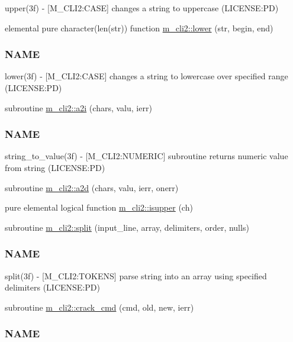 \begin{DoxyCompactItemize}
\begin{DoxyCompactList}
upper(3f) -\/ \mbox{[}M\+\_\+\+C\+L\+I2\+:C\+A\+SE\mbox{]} changes a string to uppercase (L\+I\+C\+E\+N\+SE\+:PD) \end{DoxyCompactList}\item 
elemental pure character(len(str)) function \mbox{\hyperlink{namespacem__cli2_a6d2d93ab8471667e632bf7a0e95ebd13}{m\+\_\+cli2\+::lower}} (str, begin, end)
\begin{DoxyCompactList}\small\item\em \subsubsection*{N\+A\+ME}

lower(3f) -\/ \mbox{[}M\+\_\+\+C\+L\+I2\+:C\+A\+SE\mbox{]} changes a string to lowercase over specified range (L\+I\+C\+E\+N\+SE\+:PD) \end{DoxyCompactList}\item 
subroutine \mbox{\hyperlink{namespacem__cli2_a0be58233adafc0bf10dfe69300a05b9f}{m\+\_\+cli2\+::a2i}} (chars, valu, ierr)
\begin{DoxyCompactList}\small\item\em \subsubsection*{N\+A\+ME}

string\+\_\+to\+\_\+value(3f) -\/ \mbox{[}M\+\_\+\+C\+L\+I2\+:N\+U\+M\+E\+R\+IC\mbox{]} subroutine returns numeric value from string (L\+I\+C\+E\+N\+SE\+:PD) \end{DoxyCompactList}\item 
subroutine \mbox{\hyperlink{namespacem__cli2_ad9e1de0ea9d2b4ed758b2a76bf143bd2}{m\+\_\+cli2\+::a2d}} (chars, valu, ierr, onerr)
\item 
pure elemental logical function \mbox{\hyperlink{namespacem__cli2_ad33ebc8ed3953d8cd91bd8c90a49b59d}{m\+\_\+cli2\+::isupper}} (ch)
\item 
subroutine \mbox{\hyperlink{namespacem__cli2_a6578e29ee4dc56651528e7e0acd29665}{m\+\_\+cli2\+::split}} (input\+\_\+line, array, delimiters, order, nulls)
\begin{DoxyCompactList}\small\item\em \subsubsection*{N\+A\+ME}

split(3f) -\/ \mbox{[}M\+\_\+\+C\+L\+I2\+:T\+O\+K\+E\+NS\mbox{]} parse string into an array using specified delimiters (L\+I\+C\+E\+N\+SE\+:PD) \end{DoxyCompactList}\item 
subroutine \mbox{\hyperlink{namespacem__cli2_a710b26995119aee101959555b1bac8e2}{m\+\_\+cli2\+::crack\+\_\+cmd}} (cmd, old, new, ierr)
\begin{DoxyCompactList}\small\item\em \subsubsection*{N\+A\+ME}


\end{DoxyCompactList}
\end{DoxyCompactItemize}

